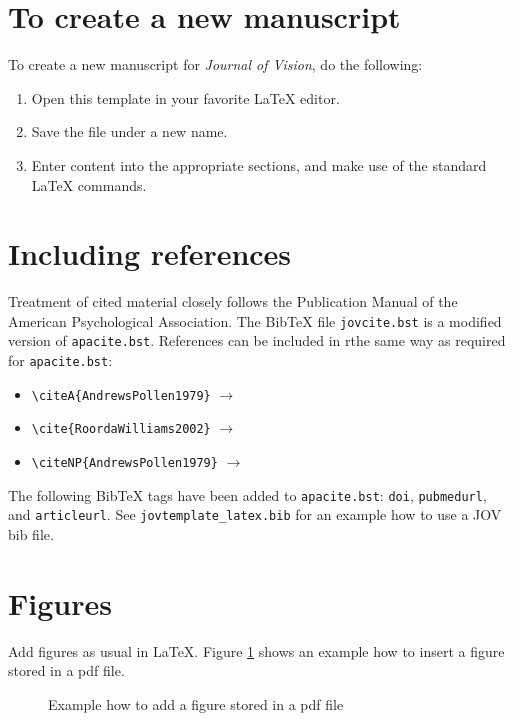 \documentclass{jov}
\begin{document}
\section{To create a new manuscript}

To create a new manuscript for \textit{Journal of Vision}, do the 
following:
\begin{enumerate}
\item Open this template in your favorite \LaTeX{} editor.
\item Save the file under a new name.
\item Enter content into the appropriate sections, and make use of the 
standard \LaTeX{} commands.

\end{enumerate}

\section{Including references}

Treatment of cited material closely follows the Publication Manual of the 
American Psychological Association. The Bib\TeX{} file \verb=jovcite.bst= 
is a modified version of \verb=apacite.bst=. References can be included in 
rthe same way as required for \verb=apacite.bst=: 
\begin{itemize}
\item \verb=\citeA{AndrewsPollen1979}= $\to$ 
\item \verb=\cite{RoordaWilliams2002}= $\to$ \cite{RoordaWilliams2002}
\item \verb=\citeNP{AndrewsPollen1979}= $\to$ 
\end{itemize}
The following Bib\TeX{} tags have been added to \verb=apacite.bst=: \verb=doi=, 
\verb=pubmedurl=, and \verb=articleurl=. See \verb=jovtemplate_latex.bib= 
for an example how to use a JOV bib file.

\section{Figures}

Add figures as usual in \LaTeX{}. Figure \ref{pdffigure} shows an example 
how to insert a figure stored in a pdf file.
\begin{figure}[h!]
\caption{Example how to add a figure stored in a pdf file}
\label{pdffigure}
\end{figure}
\end{document}
